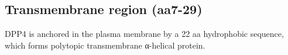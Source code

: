 \subsection{Transmembrane region (aa7-29)}

DPP4 is anchored in the plasma membrane by a 22 aa hydrophobic sequence, which forms polytopic transmembrane α-helical protein. \cite{Hong_1990}